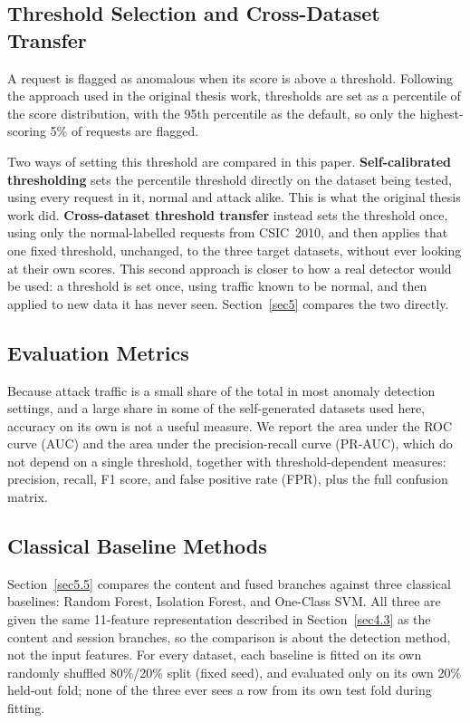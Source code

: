 \documentclass[futureinternet,article,submit,moreauthors]{Definitions/mdpi}
\begin{document}
\subsection{Threshold Selection and Cross-Dataset Transfer} \label{sec4.7}

A request is flagged as anomalous when its score is above a threshold. Following the approach used in the original thesis work, thresholds are set as a percentile of the score distribution, with the 95th percentile as the default, so only the highest-scoring 5\% of requests are flagged.

Two ways of setting this threshold are compared in this paper. \textbf{Self-calibrated thresholding} sets the percentile threshold directly on the dataset being tested, using every request in it, normal and attack alike. This is what the original thesis work did. \textbf{Cross-dataset threshold transfer} instead sets the threshold once, using only the normal-labelled requests from CSIC~2010, and then applies that one fixed threshold, unchanged, to the three target datasets, without ever looking at their own scores. This second approach is closer to how a real detector would be used: a threshold is set once, using traffic known to be normal, and then applied to new data it has never seen. Section~\ref{sec5} compares the two directly.

\subsection{Evaluation Metrics}

Because attack traffic is a small share of the total in most anomaly detection settings, and a large share in some of the self-generated datasets used here, accuracy on its own is not a useful measure. We report the area under the ROC curve (AUC) and the area under the precision-recall curve (PR-AUC), which do not depend on a single threshold, together with threshold-dependent measures: precision, recall, F1 score, and false positive rate (FPR), plus the full confusion matrix.

\subsection{Classical Baseline Methods} \label{sec4.9}

Section~\ref{sec5.5} compares the content and fused branches against three classical baselines: Random Forest, Isolation Forest, and One-Class SVM. All three are given the same 11-feature representation described in Section~\ref{sec4.3} as the content and session branches, so the comparison is about the detection method, not the input features. For every dataset, each baseline is fitted on its own randomly shuffled 80\%/20\% split (fixed seed), and evaluated only on its own 20\% held-out fold; none of the three ever sees a row from its own test fold during fitting.
\end{document}
